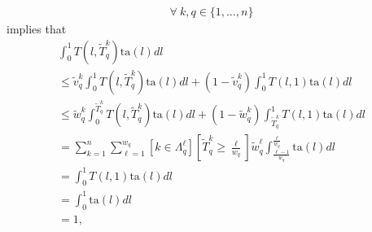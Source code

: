 \documentclass[hidelinks, nonatbib]{elsarticle}
\begin{document}
\begin{enumerate}
\begin{enumerate}
\begin{enumerate}
\begin{gather}
                \forall
                \
                k,q \in \{1, \dots, n\}
            \end{gather}
            implies that
            \begin{align}
                \int_{0}^{1}{
                    T(l,\tilde{T}_{q}^{k})
                    \text{ta}(l)
                    dl
                } 
                \\
                \leq
                \tilde{v}_{q}^{k}
                \int_{0}^{1}{
                    T(l,\tilde{T}_{q}^{k})
                    \text{ta}(l)
                    dl
                }
                +
                (1 - \tilde{v}_{q}^{k})
                \int_{0}^{1}{
                    T(l,1)
                    \text{ta}(l)
                    dl
                } 
                \\
                \leq
                \tilde{w}_{q}^{k}
                \int_{0}^{\tilde{T}_{q}^{k}}{
                    T(l,\tilde{T}_{q}^{k})
                    \text{ta}(l)
                    dl
                } + 
                (1 - \tilde{w}_{q}^{k})
                \int_{\tilde{T}_{q}^{k}}^{1}{
                    T(l,1)
                    \text{ta}(l)
                    dl
                }
                \\
                =
                \sum_{k=1}^{n}
                \sum_{\ell=1}^{w_q}
                \left[
                    k \in \Lambda_{q}^{\ell}
                \right]
                \left[
                    \tilde{T}_{q}^{k}
                    \geq 
                    \frac{\ell}{w_q}
                \right]
                \tilde{w}_{q}^{\ell}
                \int_{
                    \frac{\ell - 1}{w_q}
                }^{
                    \frac{\ell}{w_q}
                }{
                    \text{ta}(l)
                    dl
                }
                \\
                =
                \int_{0}^{1}{
                    T(l,1)
                    \text{ta}(l)
                    dl
                }
                \\
                =
                \int_{0}^{1}{
                    \text{ta}(l)
                    dl
                }
                \\
                =
                1
                ,
            \end{align}

\end{enumerate}
\end{enumerate}
\end{enumerate}
\end{document}
